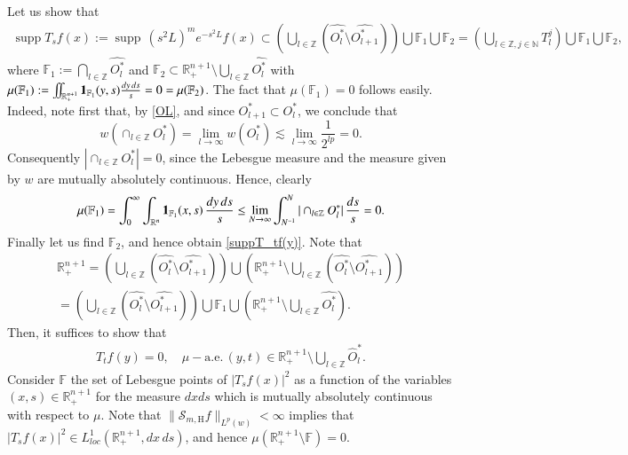 \documentclass[11pt, a4paper,leqno]{amsart}
\renewcommand{\chi}{{\bf 1}}
\theoremstyle{plain}
\theoremstyle{definition}
\theoremstyle{remark}
\numberwithin{equation}{section}
\def \R{ \mathbb{R} }
\def \N{ \mathbb{N} }
\def \Z{ \mathbb{Z} }
\def \Scal{ \mathcal{S} }
\def \hh{ \mathrm{H} }
\def \iint{\int\!\!\!\int}
\DeclareMathOperator{\supp}{supp}
\begin{document}
Let us show that 
\begin{align}\label{suppT_tf(y)}
\supp T_sf(x)\!:=\!\supp \,(s^2L)^me^{-s^2L}f(x)\subset \!
\left(\bigcup_{l\in \Z}\! \left(\widehat{O^*_l}\setminus\widehat{O^*_{l+1}}\right)\right)\!\bigcup \mathbb{F}_1\!\bigcup \mathbb{F}_2=
\left(\bigcup_{l\in \Z,j\in \N} \!\!T_l^j\right)\bigcup \mathbb{F}_1\!\bigcup \mathbb{F}_2,
\end{align}
where $\mathbb{F}_1:=\bigcap_{l\in \Z}\widehat{O^*_l}$ and $\mathbb{F}_2\subset \R^{n+1}_+\setminus \bigcup_{l\in \Z}\widehat{O^*_l}$ with $\mu(\mathbb{F}_1):=\iint_{\R^{n+1}_+}\chi_{\mathbb{F}_1}(y,s)\frac{dy\,ds}{s}=0=\mu(\mathbb{F}_2)$. The fact that $\mu(\mathbb{F}_1)=0$ follows easily. Indeed, note first
that, by \eqref{OL}, and 
since $O^*_{l+1}\subset O^*_{l}$, we conclude that
$$
w(\cap_{l\in \Z}O^*_l)=\lim_{l\rightarrow \infty}w(O^*_l)
\lesssim \lim_{l\rightarrow \infty}
\frac{1}{2^{lp}}=0.
$$
Consequently $|\cap_{l\in \Z}O^*_l|=0$, since the Lebesgue measure and the measure given by $w$ are mutually absolutely continuous.  Hence, clearly 
\begin{align*}
\mu(\mathbb{F}_1)=
\int_{0}^{\infty}\int_{\R^n}\chi_{\mathbb{F}_1}(x,s)\,\frac{dy\,ds}{s}
\leq \lim_{N\rightarrow \infty}
\int_{N^{-1}}^N|\cap_{l\in \Z}O^*_l|\,\frac{ds}{s}=0.
\end{align*}
Finally let us find $\mathbb{F}_2$, and hence obtain
\eqref{suppT_tf(y)}.
Note that 
\begin{multline*}
\R^{n+1}_+=\left(\bigcup_{l\in \Z} \left(\widehat{O^*_l}\setminus\widehat{O^*_{l+1}}\right)\right)\bigcup
\left(\R^{n+1}_+\setminus \bigcup_{l\in \Z} \left(\widehat{O^*_l}\setminus\widehat{O^*_{l+1}}\right)\right)
\\
=
\left(\bigcup_{l\in \Z} \left(\widehat{O^*_l}\setminus\widehat{O^*_{l+1}}\right)\right)
\bigcup\mathbb{F}_1\bigcup
\left(\R^{n+1}_+\setminus \bigcup_{l\in \Z} \widehat{O^*_l}\right).
\end{multline*}
Then, it suffices to show that 
\begin{align}\label{cero}
T_tf(y)=0, \quad \mu-\textrm{a.e.}\, (y,t)\in\R^{n+1}_+\setminus\bigcup_{l\in \Z} \widehat{O}^*_l.
\end{align}
%
Consider $\mathbb{F}$ the set of Lebesgue points of $|T_sf(x)|^2$ as a function of the variables $(x,s)\in \R^{n+1}_+$ for the measure $dxds$ which is mutually absolutely continuous with respect to $\mu$. Note that $\|\Scal_{m,\hh}f\|_{L^p(w)}<\infty$
implies that
$|T_sf(x)|^2\in L^1_{loc}(\R^{n+1}_+,dx\,ds)$, and hence
$\mu(\R^{n+1}_+\setminus \mathbb{F})=0$. 
\end{document}
